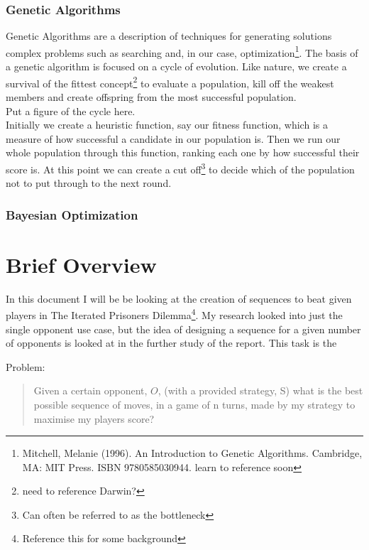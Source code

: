             \subsubsection{Genetic Algorithms}
            Genetic Algorithms are a description of techniques for generating solutions complex problems such as searching and, in our case, optimization\footnote{Mitchell, Melanie (1996). An Introduction to Genetic Algorithms. Cambridge, MA: MIT Press. ISBN 9780585030944. learn to reference soon}. The basis of a genetic algorithm is focused on a cycle of evolution. Like nature, we create a survival of the fittest concept\footnote{need to reference Darwin?} to evaluate a population, kill off the weakest members and create offspring from the most successful population.\\
            
            Put a figure of the cycle here.\label{fig:genetic algo cycle} \\
                       
            Initially we create a heuristic function, say our fitness function, which is a measure of how successful a candidate in our population is. Then we run our whole population through this function, ranking each one by how successful their score is. At this point we can create a cut off\footnote{Can often be referred to as the bottleneck} to decide which of the population not to put through to the next round.\\          
            \subsubsection{Bayesian Optimization}

    \section{Brief Overview}
    In this document I will be be looking at the creation of sequences to beat given players in The Iterated Prisoners Dilemma\footnote{Reference this for some background}. My research looked into just the single opponent use case, but the idea of designing a sequence for a given number of opponents is looked at in the further study of the report. This task is the 
    
    
    Problem:\\
    \begin{quotation}
        Given a certain opponent, \(O\), (with a provided strategy, S) what is the best possible sequence of moves, in a game of n turns, made by my strategy to maximise my players score? 
    \end{quotation}

